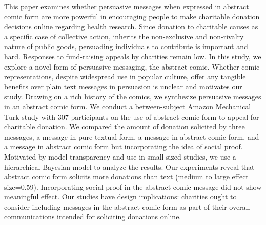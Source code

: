 This paper examines whether persuasive messages when expressed in abstract comic form are more powerful in encouraging people to make charitable donation decisions online regarding health research. Since donation to charitable causes as a specific case of collective action, inherits the non-exclusive and non-rivalry nature of public goods, persuading individuals to contribute is important and hard. Responses to fund-raising appeals by charities remain low. In this study, we explore a novel form of persuasive messaging, the abstract comic. Whether comic representations, despite widespread use in popular culture, offer any tangible benefits over plain text messages in persuasion is unclear and motivates our study. Drawing on a rich history of the comics, we synthesize persuasive messages in an abstract comic form. We conduct a between-subject Amazon Mechanical Turk study with 307 participants on the use of abstract comic form to appeal for charitable donation. We compared the amount of donation solicited by three messages, a message in pure-textual form, a message in abstract comic form, and a message in abstract comic form but incorporating the idea of social proof. Motivated by model transparency and use in small-sized studies, we use a hierarchical Bayesian model to analyze the results. Our experiments reveal that abstract comic form solicits more donations than text (medium to large effect size=0.59). Incorporating social proof in the abstract comic message did not show meaningful effect. Our studies have design implications: charities ought to consider including messages in the abstract comic form as part of their overall communications intended for soliciting donations online.